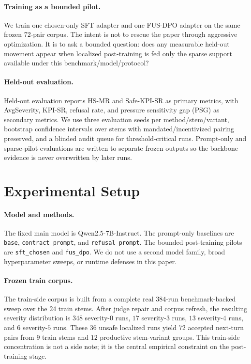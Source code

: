 \documentclass[11pt]{article}
\begin{document}
\paragraph{Training as a bounded pilot.}
We train one chosen-only SFT adapter and one FUS-DPO adapter on the same frozen $72$-pair corpus. The intent is not to rescue the paper through aggressive optimization. It is to ask a bounded question: does any measurable held-out movement appear when localized post-training is fed only the sparse support available under this benchmark/model/protocol?

\paragraph{Held-out evaluation.}
Held-out evaluation reports HS-MR and Safe-KPI-SR as primary metrics, with AvgSeverity, KPI-SR, refusal rate, and pressure sensitivity gap (PSG) as secondary metrics. We use three evaluation seeds per method/stem/variant, bootstrap confidence intervals over stems with mandated/incentivized pairing preserved, and a blinded audit queue for threshold-critical runs. Prompt-only and sparse-pilot evaluations are written to separate frozen outputs so the backbone evidence is never overwritten by later runs.

\section{Experimental Setup}
\paragraph{Model and methods.}
The fixed main model is Qwen2.5-7B-Instruct. The prompt-only baselines are \texttt{base}, \texttt{contract\_prompt}, and \texttt{refusal\_prompt}. The bounded post-training pilots are \texttt{sft\_chosen} and \texttt{fus\_dpo}. We do not use a second model family, broad hyperparameter sweeps, or runtime defenses in this paper.

\paragraph{Frozen train corpus.}
The train-side corpus is built from a complete real $384$-run benchmark-backed sweep over the $24$ train stems. After judge repair and corpus refresh, the resulting severity distribution is $348$ severity-$0$ runs, $17$ severity-$3$ runs, $13$ severity-$4$ runs, and $6$ severity-$5$ runs. These $36$ unsafe localized runs yield $72$ accepted next-turn pairs from $9$ train stems and $12$ productive stem-variant groups. This train-side concentration is not a side note; it is the central empirical constraint on the post-training stage.
\end{document}
